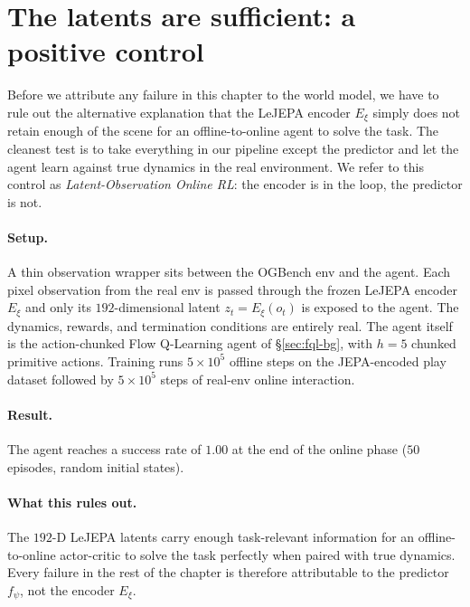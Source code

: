 \section{The latents are sufficient: a positive control}
\label{sec:owm-latent-obs}

Before we attribute any failure in this chapter to the world model, we
have to rule out the alternative explanation that the LeJEPA encoder
$E_\xi$ simply does not retain enough of the scene for an offline-to-online
agent to solve the task. The cleanest test is to take everything in our
pipeline except the predictor and let the agent learn against true
dynamics in the real environment. We refer to this control as
\emph{Latent-Observation Online RL}: the encoder is in the loop, the
predictor is not.

\paragraph{Setup.}
A thin observation wrapper sits between the OGBench env and the agent.
Each pixel observation from the real env is passed through the frozen
LeJEPA encoder $E_\xi$ and only its $192$-dimensional latent
$z_t = E_\xi(o_t)$ is exposed to the agent. The dynamics, rewards, and
termination conditions are entirely real. The agent itself is the
action-chunked Flow Q-Learning agent of \S\ref{sec:fql-bg}, with $h=5$
chunked primitive actions. Training runs $5\!\times\!10^5$ offline
steps on the JEPA-encoded play dataset followed by $5\!\times\!10^5$
steps of real-env online interaction.

\paragraph{Result.}
The agent reaches a success rate of $1.00$ at the end of the online
phase ($50$ episodes, random initial states).

\paragraph{What this rules out.}
The $192$-D LeJEPA latents carry enough task-relevant information for an
offline-to-online actor-critic to solve the task perfectly when paired
with true dynamics. Every failure in the rest of the chapter is
therefore attributable to the predictor $f_\psi$, not the encoder
$E_\xi$.

